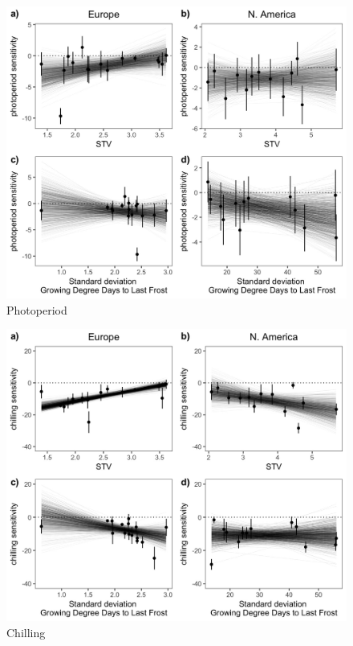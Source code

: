 \documentclass[12pt]{article}
\begin{document}
\begin{figure}[h!]
    \centering
 \includegraphics[width=\textwidth]{..//..//analyses/ranges/figures/contz_photo.jpeg} 
    \caption{Photoperiod}
    \label{fig:photo}
\end{figure}

\begin{figure}[h!]
    \centering
 \includegraphics[width=\textwidth]{..//..//analyses/ranges/figures/contz_chill.jpeg} 
    \caption{Chilling}
    \label{fig:chill}
\end{figure}
\end{document}
